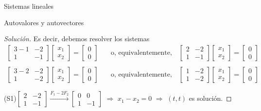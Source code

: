 \begin{chapter}{Sistemas lineales}
\begin{section}{Autovalores y autovectores}
\begin{proof}[Solución]
     
        Es decir,  debemos resolver los sistemas
        \begin{align*}
            \begin{bmatrix} 3 - 1&-2 \\ 1&-1\end{bmatrix}
            \begin{bmatrix}	x_1\\x_2\end{bmatrix}
            =
            \begin{bmatrix}	0\\0\end{bmatrix}
            \quad &\text{o, equivalentemente,} \quad 
            \begin{bmatrix} 2&-2 \\ 1&-1 \end{bmatrix}
            \begin{bmatrix}	x_1\\x_2\end{bmatrix}
            =
            \begin{bmatrix}	0\\0\end{bmatrix} \tag{S1}
            \\
            &
            \\
            \begin{bmatrix}	3 - 2&-2 \\ 1&-2\end{bmatrix}
            \begin{bmatrix}	x_1\\x_2\end{bmatrix}
            =
            \begin{bmatrix}	0\\0\end{bmatrix}
            \quad &\text{o, equivalentemente,} \quad 
            \begin{bmatrix}1&-2 \\ 1&-2\end{bmatrix}
            \begin{bmatrix}	x_1\\x_2\end{bmatrix}
            =
            \begin{bmatrix}	0\\0\end{bmatrix} \tag{S2}
        \end{align*}

        (S1)\quad $\begin{bmatrix} 2&-2 \\ 1&-1 \end{bmatrix} \stackrel{F_1 -2F_2}{\longrightarrow} \begin{bmatrix} 0&0 \\ 1&-1 \end{bmatrix}$  $\Rightarrow$ $x_1-x_2=0$ $\Rightarrow$ $(t,t)$ es solución. 


\end{proof}
\end{section}
\end{chapter}
